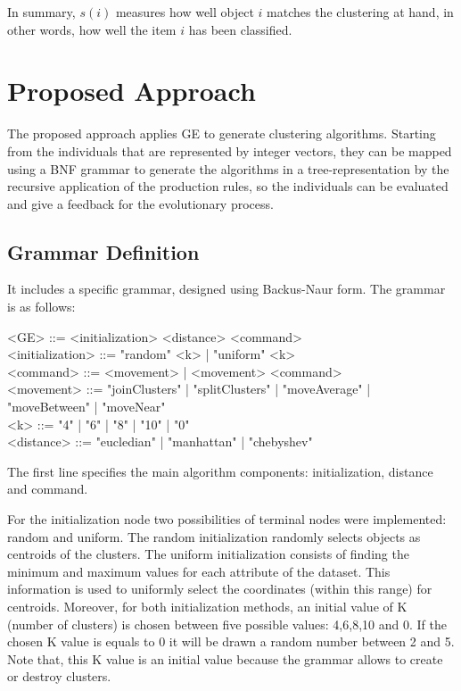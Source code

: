 \documentclass[conference,compsoc]{IEEEtran}
\begin{document}
In summary, $s(i)$ measures how well object $i$ matches the clustering at hand, in other words, how well the item $i$ has been classified.


\section{Proposed Approach} \label{sec:methodology}

The proposed approach applies GE to generate clustering algorithms. Starting from the individuals that are represented by integer vectors, they can be mapped using a BNF grammar to generate the algorithms in a tree-representation by the recursive application of the production rules, so the individuals can be evaluated and give a feedback for the evolutionary process.


\subsection{Grammar Definition}

It includes a specific grammar, designed  using  Backus-Naur form. The grammar is as follows:

\begin{grammar}
	<GE> ::= <initialization> <distance> <command> 
	\\ <initialization> ::= "random" <k> | "uniform" <k>
	\\ <command> ::= <movement> | <movement> <command>
	\\ <movement> ::= "joinClusters" | "splitClusters" | "moveAverage" | "moveBetween" | "moveNear" 
	\\ <k> ::= "4" | "6" | "8" | "10" | "0"
	\\ <distance> ::= "eucledian" | "manhattan" | "chebyshev"
	\label{ge-clustering-grammar}
\end{grammar}


The first line specifies the main algorithm components: initialization, distance and command. 

For the initialization node two possibilities of terminal nodes were implemented: random and uniform. The random initialization randomly selects  objects as centroids of the clusters. The uniform initialization consists of finding the minimum and maximum values for each attribute of the dataset. This information is used to uniformly select the coordinates (within this range) for centroids. Moreover, for both initialization methods, an initial value of K (number of clusters) is chosen between five possible values: 4,6,8,10 and 0. If the chosen K value is equals to 0 it will be drawn a random number between 2 and 5. Note that, this K value is an initial value because the grammar allows to create or destroy clusters. 
\end{document}
